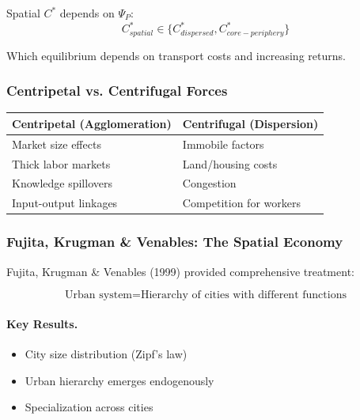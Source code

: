 Spatial $C^*$ depends on $\Psi_P$:
\begin{equation}
C^*_{spatial} \in \{C^*_{dispersed}, C^*_{core-periphery}\}
\end{equation}

Which equilibrium depends on transport costs and increasing returns.

\subsubsection{Centripetal vs. Centrifugal Forces}

\begin{center}
\renewcommand{\arraystretch}{1.3}
\begin{tabular}{|l|l|}
\hline
\textbf{Centripetal (Agglomeration)} & \textbf{Centrifugal (Dispersion)} \\
\hline
Market size effects & Immobile factors \\
Thick labor markets & Land/housing costs \\
Knowledge spillovers & Congestion \\
Input-output linkages & Competition for workers \\
\hline
\end{tabular}
\end{center}

\subsubsection{Fujita, Krugman \& Venables: The Spatial Economy}

Fujita, Krugman \& Venables (1999) provided comprehensive treatment:

\begin{equation}
\text{Urban system} = \text{Hierarchy of cities with different functions}
\end{equation}

\paragraph{Key Results.}
\begin{itemize}
    \item City size distribution (Zipf's law)
    \item Urban hierarchy emerges endogenously
    \item Specialization across cities
\end{itemize}

